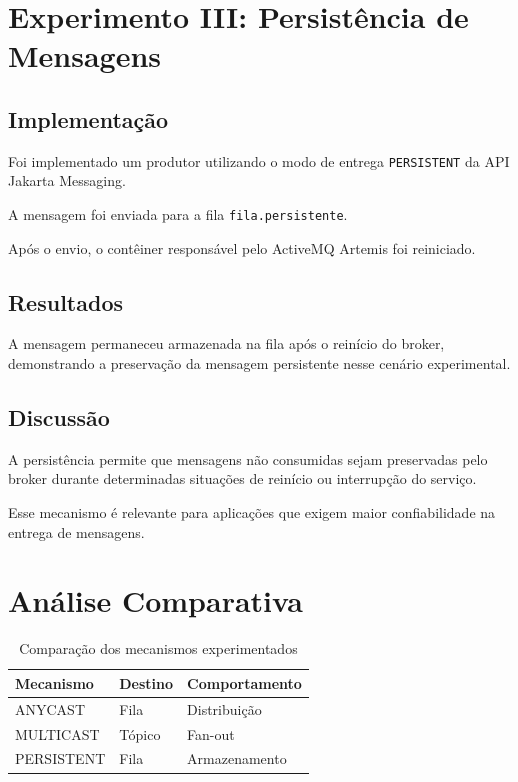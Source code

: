 \documentclass[12pt,a4paper]{article}
\begin{document}

\section{Experimento III: Persistência de Mensagens}

\subsection{Implementação}

Foi implementado um produtor utilizando
o modo de entrega \texttt{PERSISTENT}
da API Jakarta Messaging.

A mensagem foi enviada para a fila
\texttt{fila.persistente}.

Após o envio, o contêiner responsável
pelo ActiveMQ Artemis foi reiniciado.

\subsection{Resultados}

A mensagem permaneceu armazenada na fila
após o reinício do broker, demonstrando
a preservação da mensagem persistente
nesse cenário experimental.


\subsection{Discussão}

A persistência permite que mensagens
não consumidas sejam preservadas pelo broker
durante determinadas situações de reinício
ou interrupção do serviço.

Esse mecanismo é relevante para aplicações
que exigem maior confiabilidade na
entrega de mensagens.

\section{Análise Comparativa}

\begin{table}[H]
\centering
\caption{Comparação dos mecanismos experimentados}
\begin{tabular}{lll}
\toprule
\textbf{Mecanismo} &
\textbf{Destino} &
\textbf{Comportamento} \\
\midrule
ANYCAST & Fila & Distribuição \\
MULTICAST & Tópico & Fan-out \\
PERSISTENT & Fila & Armazenamento \\
\bottomrule
\end{tabular}
\label{tab:comparacao}
\end{table}
\end{document}
